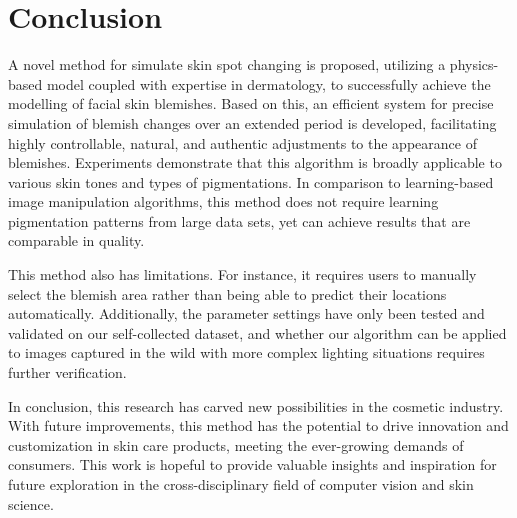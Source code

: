 
\chapter{Conclusion}
\begin{spacing}{1.5}
\setlength{\parskip}{0.3in}

A novel method for simulate skin spot changing is proposed, utilizing a physics-based model coupled with expertise in dermatology, to successfully achieve the modelling of facial skin blemishes. Based on this, an efficient system for precise simulation of blemish changes over an extended period is developed, facilitating highly controllable, natural, and authentic adjustments to the appearance of blemishes. Experiments demonstrate that this algorithm is broadly applicable to various skin tones and types of pigmentations. In comparison to learning-based image manipulation algorithms, this method does not require learning pigmentation patterns from large data sets, yet can achieve results that are comparable in quality.

This method also has limitations. For instance, it requires users to manually select the blemish area rather than being able to predict their locations automatically. Additionally, the parameter settings have only been tested and validated on our self-collected dataset, and whether our algorithm can be applied to images captured in the wild with more complex lighting situations requires further verification.

In conclusion, this research has carved new possibilities in the cosmetic industry. With future improvements, this method has the potential to drive innovation and customization in skin care products, meeting the ever-growing demands of consumers. This work is hopeful to provide valuable insights and inspiration for future exploration in the cross-disciplinary field of computer vision and skin science.

\end{spacing}
\newpage
